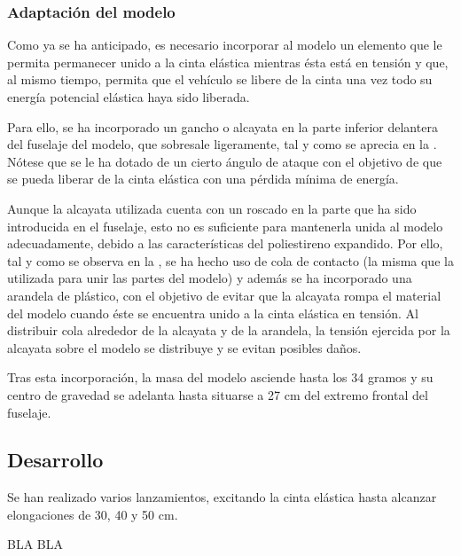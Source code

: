 \subsubsection{Adaptación del modelo}
\label{sec:tests:preparation:adaptation}

Como ya se ha anticipado, es necesario incorporar al modelo un elemento que le permita permanecer unido a la cinta elástica mientras ésta está en tensión y que, al mismo tiempo, permita que el vehículo se libere de la cinta una vez todo su energía potencial elástica haya sido liberada.

Para ello, se ha incorporado un gancho o alcayata en la parte inferior delantera del fuselaje del modelo, que sobresale ligeramente, tal y como se aprecia en la . Nótese que se le ha dotado de un cierto ángulo de ataque con el objetivo de que se pueda liberar de la cinta elástica con una pérdida mínima de energía.

Aunque la alcayata utilizada cuenta con un roscado en la parte que ha sido introducida en el fuselaje, esto no es suficiente para mantenerla unida al modelo adecuadamente, debido a las características del poliestireno expandido. Por ello, tal y como se observa en la , se ha hecho uso de cola de contacto (la misma que la utilizada para unir las partes del modelo) y además se ha incorporado una arandela de plástico, con el objetivo de evitar que la alcayata rompa el material del modelo cuando éste se encuentra unido a la cinta elástica en tensión. Al distribuir cola alrededor de la alcayata y de la arandela, la tensión ejercida por la alcayata sobre el modelo se distribuye y se evitan posibles daños.

Tras esta incorporación, la masa del modelo asciende hasta los 34 gramos y su centro de gravedad se adelanta hasta situarse a 27 cm del extremo frontal del fuselaje.


\subsection{Desarrollo}
\label{sec:tests:development}

Se han realizado varios lanzamientos, excitando la cinta elástica hasta alcanzar elongaciones de 30, 40 y 50 cm.

BLA BLA

